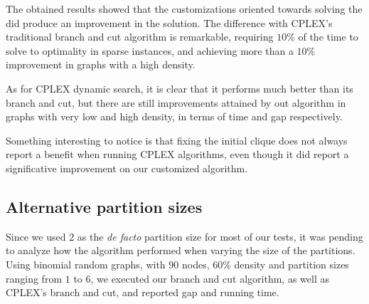 The obtained results showed that the customizations oriented towards solving the \PCP{} did produce an improvement in the solution. The difference with \textsc{CPLEX}'s traditional branch and cut algorithm is remarkable, requiring $10\%$ of the time to solve to optimality in sparse instances, and achieving more than a $10\%$ improvement in graphs with a high density.

As for \textsc{CPLEX} dynamic search, it is clear that it performs much better than its branch and cut, but there are still improvements attained by out algorithm in graphs with very low and high density, in terms of time and gap respectively.

Something interesting to notice is that fixing the initial clique does not always report a benefit when running \textsc{CPLEX} algorithms, even though it did report a significative improvement on our customized algorithm.

\subsection{Alternative partition sizes}

Since we used $2$ as the \textit{de facto} partition size for most of our tests, it was pending to analyze how the algorithm performed when varying the size of the partitions. Using binomial random graphs, with $90$ nodes, $60\%$ density and partition sizes ranging from $1$ to $6$, we executed our branch and cut algorithm, as well as \textsc{CPLEX}'s branch and cut, and reported gap and running time.


